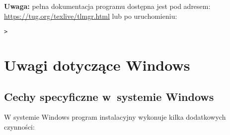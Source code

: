 \documentclass{article}
\begin{document}
\noindent
\textbf{Uwaga:} pełna dokumentacja programu  dostępna
jest pod adresem:
\url{https://tug.org/texlive/tlmgr.html} lub po uruchomieniu:
\begin{alltt}
> 
\end{alltt}

\section{Uwagi dotyczące Windows}
\label{sec:windows}

\subsection{Cechy specyficzne w~systemie Windows}
\label{sec:winfeatures}

W systemie Windows program instalacyjny wykonuje kilka dodatkowych czynności:
\end{document}

